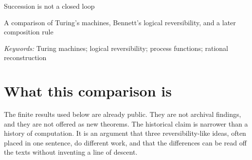 \documentclass[12pt]{article}
\begin{document}
\begin{center}
{\Large Succession is not a closed loop\par}
\vspace{0.6em}
{\large A comparison of Turing's machines, Bennett's logical reversibility, and a later composition rule\par}
\vspace{0.8em}
\end{center}

\begin{abstract}
Turing's 1936 account of computation is a theory of successive complete configurations of a machine with finitely many states and one scanned square. A number can be defined and fail to be computable, and a machine is circular, in his sense, when it prints only finitely many figures, not when its causal graph contains a cycle. Bennett's 1973 construction shows that an ordinary Turing machine can be emulated by a machine whose transition function has a single-valued inverse at every step, by saving a history, copying the output, and then uncomputing the history. That reversibility is still reversibility of a succession. A process function, in a literature that begins decades later, is a different object: a wiring in which every replacement of the local maps has exactly one global history. Its canonical closed-loop operator is unitary for every local unitary and every matched ancilla if and only if that condition holds, while a bare permutation of a source-sink space exists for wirings that are not process functions. No influence from Turing or Bennett to that later formalism is claimed or documented here. The comparison is a rational reconstruction of three jobs. It is not a story in which each result completes the previous one.
\end{abstract}

\noindent\textit{Keywords:} Turing machines; logical reversibility; process functions; rational reconstruction

\section{What this comparison is}
\label{sec:job}

The finite results used below are already public. They are not archival findings, and they are not offered as new theorems. The historical claim is narrower than a history of computation. It is an argument that three reversibility-like ideas, often placed in one sentence, do different work, and that the differences can be read off the texts without inventing a line of descent.
\end{document}
